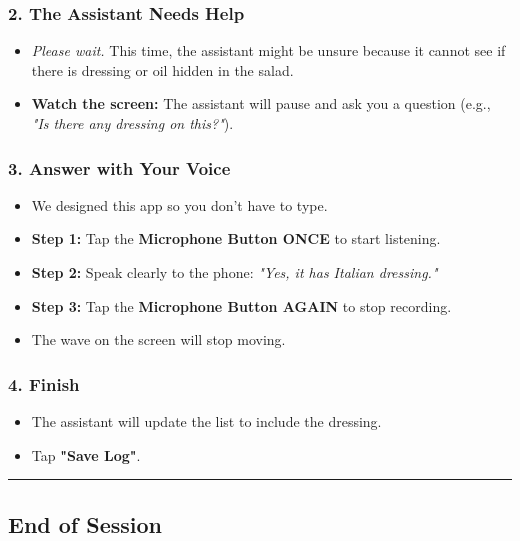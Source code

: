 \subsubsection*{2. The Assistant Needs Help}

\begin{itemize}
    \item \textit{Please wait.} This time, the assistant might be unsure because it cannot see if there is dressing or oil hidden in the salad.
    \item \textbf{Watch the screen:} The assistant will pause and ask you a question (e.g., \textit{"Is there any dressing on this?"}).
\end{itemize}

\subsubsection*{3. Answer with Your Voice}

\begin{itemize}
    \item We designed this app so you don't have to type.
    \item \textbf{Step 1:} Tap the \textbf{Microphone Button ONCE} to start listening.
    \item \textbf{Step 2:} Speak clearly to the phone: \textit{"Yes, it has Italian dressing."}
    \item \textbf{Step 3:} Tap the \textbf{Microphone Button AGAIN} to stop recording.
    \item The wave on the screen will stop moving.
\end{itemize}

\subsubsection*{4. Finish}

\begin{itemize}
    \item The assistant will update the list to include the dressing.
    \item Tap \textbf{"Save Log"}.
\end{itemize}

\vspace{1em}
\hrule
\vspace{1em}

\subsection*{End of Session}

